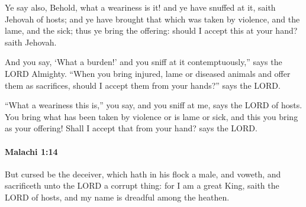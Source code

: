 			\begin{versebox}
					\item[BHS] 
					\item[LXX] 
					\item[ASV] Ye say also, Behold, what a weariness is it! and ye have snuffed at it, saith Jehovah of hosts; and ye have brought that which was taken by violence, and the lame, and the sick; thus ye bring the offering: should I accept this at your hand? saith Jehovah.
					\item[NIV] And you say, ‘What a burden!’ and you sniff at it contemptuously,” says the LORD Almighty. “When you bring injured, lame or diseased animals and offer them as sacrifices, should I accept them from your hands?” says the LORD.
					\item[NRSV] “What a weariness this is,” you say, and you sniff at me, says the LORD of hosts. You bring what has been taken by violence or is lame or sick, and this you bring as your offering! Shall I accept that from your hand? says the LORD.
			\end{versebox}

		\paragraph{Malachi 1:14} %
			\label{MALACHI-1-14}

			But cursed be the deceiver, which hath in his flock a male, and voweth, and sacrificeth unto the LORD a corrupt thing: for I am a great King, saith the LORD of hosts, and my name is dreadful among the heathen.

